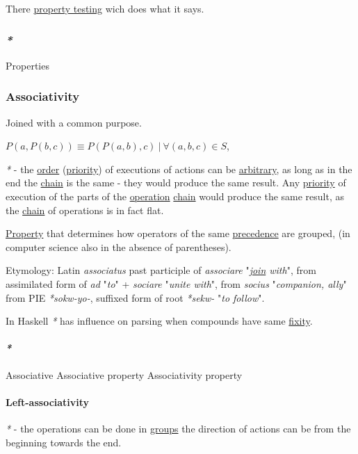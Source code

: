 \documentclass[a4paper,14pt,oneside]{book}
\begin{document}
There \hyperref[org741dbd3]{property testing} wich does what it says.

\subsubsection{\emph{*}}
\label{sec:org2829492}

\label{orgb42a88f}Properties

\subsubsection{\label{org378abe7}Associativity}
\label{sec:org2f17a10}
Joined with a common purpose.

\(P(a,P(b,c)) \equiv P(P(a,b),c) \ | \ \forall (a,b,c) \in S\),

\emph{*} - the \hyperref[org0589d5a]{order} (\hyperref[orgcbfecea]{priority}) of executions of actions can be \hyperref[org904552c]{arbitrary}, as long as in the end the \hyperref[org3b5ce40]{chain} is the same - they would produce the same result.
Any \hyperref[orgcbfecea]{priority} of execution of the parts of the \hyperref[orge1bc58d]{operation} \hyperref[org3b5ce40]{chain} would produce the same result, as the \hyperref[org3b5ce40]{chain} of operations is in fact flat.

\hyperref[orgbfedd9a]{Property} that determines how operators of the same \hyperref[orga58750d]{precedence} are grouped, (in computer science also in the absence of parentheses).

Etymology:
Latin \emph{associatus} past participle of \emph{associare} "\emph{\hyperref[org2a633e1]{join} with}", from assimilated form of \emph{ad} "\emph{to}" + \emph{sociare} "\emph{unite with}", from \emph{socius} "\emph{companion, ally}" from PIE \emph{*sokw-yo-}, suffixed form of root \emph{*sekw-} "\emph{to follow}".

In Haskell \emph{*} has influence on parsing when compounds have same \hyperref[org2953449]{fixity}.

\paragraph{\emph{*}}
\label{sec:org8b29cbd}

\label{orged21b43}Associative
\label{orgf9aa608}Associative property
\label{orgcabd986}Associativity property

\paragraph{\label{orge8d1ab6}Left-associativity}
\label{sec:org5c6d47c}
\emph{*} - the operations can be done in \hyperref[org053a392]{groups} the direction of actions can be from the beginning towards the end.
\end{document}

